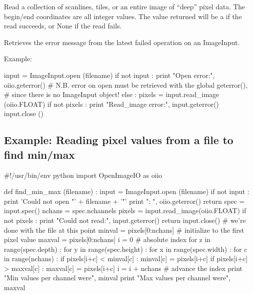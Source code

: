 
Read a collection of scanlines, tiles, or an entire image of ``deep'' pixel
data. The begin/end coordinates are all integer values. The value returned
will be a \DeepData if the read succeeds, or {\cf None} if the read fails.
\apiend

Retrieves the error message from the latest failed operation on an
ImageInput.

\noindent Example:
\begin{code}
    input = ImageInput.open (filename)
    if not input :
        print "Open error:", oiio.geterror()
        # N.B. error on open must be retrieved with the global geterror(),
        # since there is no ImageInput object!
    else :
        pixels = input.read_image (oiio.FLOAT)
        if not pixels :
            print "Read_image error:", input.geterror()
        input.close ()
\end{code}
\apiend

\newpage
\subsection*{Example: Reading pixel values from a file to find min/max}

\begin{code}
#!/usr/bin/env python 
import OpenImageIO as oiio

def find_min_max (filename) :
    input = ImageInput.open (filename)
    if not input :
        print 'Could not open "' + filename + '"'
        print "\tError: ", oiio.geterror()
        return
    spec = input.spec()
    nchans = spec.nchannels
    pixels = input.read_image(oiio.FLOAT)
    if not pixels :
        print "Could not read:", input.geterror()
        return
    input.close()    # we're done with the file at this point
    minval = pixels[0:nchans]   # initialize to the first pixel value
    maxval = pixels[0:nchans]
    i = 0    # absolute index
    for z in range(spec.depth) :
        for y in range(spec.height) :
            for x in range(spec.width) :
                for c in range(nchans) :
                    if pixels[i+c] < minval[c] :
                        minval[c] = pixels[i+c]
                    if pixels[i+c] > maxval[c] :
                        maxval[c] = pixels[i+c]
                i = i + nchans   # advance the index
    print "Min values per channel were", minval
    print "Max values per channel were", maxval
\end{code}
\newpage


